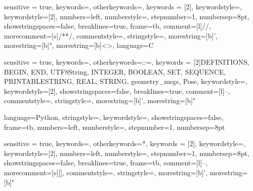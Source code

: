 \newcommand{\aadl}[1]{\lstinline[language=AADL]{#1}}




{
	sensitive = true,
	keywords={},
	otherkeywords={},%
  	keywords = [2]{},
  	keywordstyle=\color{ros_keyword},
  	keywordstyle=[2]\color{ros_keyword},%
  	numbers=left,
  	numberstyle=\scriptsize,
  	stepnumber=1,
  	numbersep=8pt,
  	showstringspaces=false,
  	breaklines=true,
  	frame=tb,
  	comment=[l]{//},
  	morecomment=[s]{/*}{*/},
  	commentstyle=\color{aadl_comment_green}\ttfamily,
  	stringstyle=\color{ros_string}\ttfamily,
  	morestring=[b]',
  	morestring=[b]",
    morestring=[b]{<}{>},
    language=C
}

\newcommand{\ros}[1]{\lstinline[language=ROS]{#1}}



{
	sensitive = true,
	keywords={},
	otherkeywords={::=},%
  	keywords = [2]{DEFINITIONS, BEGIN, END, UTF8String, INTEGER, BOOLEAN, SET, SEQUENCE, PRINTABLESTRING, REAL, STRING, geometry_msgs, Pose},
  	keywordstyle=\color{ros_keyword},
  	keywordstyle=[2]\color{ros_string},%
  	showstringspaces=false,
  	breaklines=true,
  	comment=[l]{--},
  	commentstyle=\color{aadl_comment_green}\ttfamily,
  	stringstyle=\color{red}\ttfamily,
  	morestring=[b]',
  	morestring=[b]"
}

\newcommand{\asn}[1]{\lstinline[language=ASN1]{#1}}


\lstdefinelanguage{{}}
{
	language=Python,
    stringstyle=\color{black},
    keywordstyle=\color{darkblue},
    showstringspaces=false,
    frame=tb,
    numbers=left,
    numberstyle=\scriptsize,
    stepnumber=1,
    numbersep=8pt
}

\newcommand{\py}[1]{\lstinline[language=Pythone]{#1}}


{
	sensitive = true,
	keywords={},
	otherkeywords={*},%
  	keywords = [2]{},
  	keywordstyle=\color{darkblue},
  	keywordstyle=[2]\color{ros_string},%
  	numbers=left,
  	numberstyle=\scriptsize,
  	stepnumber=1,
  	numbersep=8pt,
  	showstringspaces=false,
  	breaklines=true,
  	frame=tb,
  	comment=[l]{--},
  	morecomment=[s]{[}{]},
  	commentstyle=\color{darkblue}\ttfamily,
  	stringstyle=\color{red}\ttfamily,
  	morestring=[b]',
  	morestring=[b]"
}